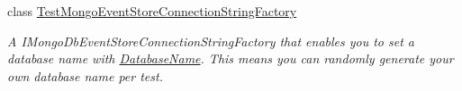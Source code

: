 \begin{DoxyCompactItemize}
class \hyperlink{classCqrs_1_1MongoDB_1_1Tests_1_1Integration_1_1TestMongoEventStoreConnectionStringFactory}{Test\+Mongo\+Event\+Store\+Connection\+String\+Factory}
\begin{DoxyCompactList}\small\item\em A I\+Mongo\+Db\+Event\+Store\+Connection\+String\+Factory that enables you to set a database name with \hyperlink{classCqrs_1_1MongoDB_1_1Tests_1_1Integration_1_1TestMongoEventStoreConnectionStringFactory_a647bfdbf4eef2cffe60f86e3ac01efac_a647bfdbf4eef2cffe60f86e3ac01efac}{Database\+Name}. This means you can randomly generate your own database name per test. \end{DoxyCompactList}\end{DoxyCompactItemize}

